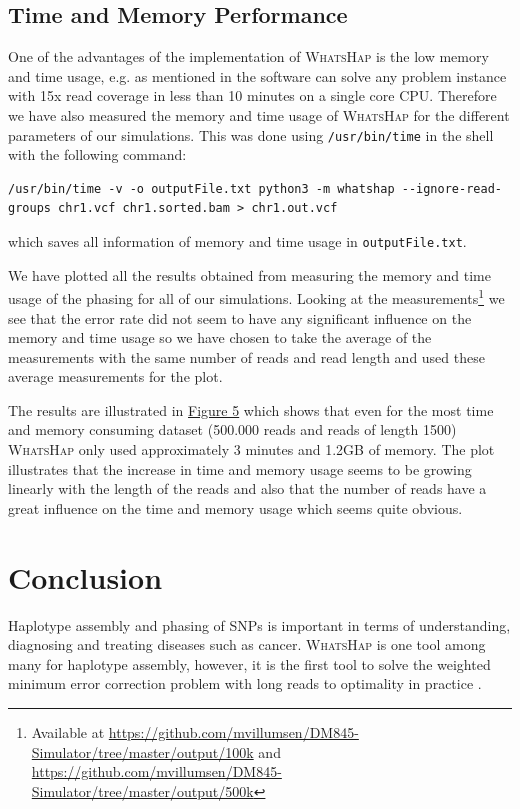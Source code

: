 \documentclass[10pt,a4paper]{article}
\begin{document}
\subsection{Time and Memory Performance}
One of the advantages of the implementation of \textsc{WhatsHap} is the low memory and time usage, e.g. as mentioned in \cite{whatshap} the software can solve any problem instance with 15x read coverage in less than 10 minutes on a single core CPU. Therefore we have also measured the memory and time usage of \textsc{WhatsHap} for the different parameters of our simulations. This was done using \texttt{/usr/bin/time} in the shell with the following command:
\begin{lstlisting}
/usr/bin/time -v -o outputFile.txt python3 -m whatshap --ignore-read-groups chr1.vcf chr1.sorted.bam > chr1.out.vcf
\end{lstlisting}
which saves all information of memory and time usage in \texttt{outputFile.txt}.

We have plotted all the results obtained from measuring the memory and time usage of the phasing for all of our simulations. Looking at the measurements\footnote{Available at \url{https://github.com/mvillumsen/DM845-Simulator/tree/master/output/100k} and \url{https://github.com/mvillumsen/DM845-Simulator/tree/master/output/500k}} we see that the error rate did not seem to have any significant influence on the memory and time usage so we have chosen to take the average of the measurements with the same number of reads and read length and used these average measurements for the plot.

The results are illustrated in \hyperref[fig:performance]{Figure 5} which shows that even for the most time and memory consuming dataset (500.000 reads and reads of length 1500) \textsc{WhatsHap} only used approximately 3 minutes and 1.2GB of memory. The plot illustrates that the increase in time and memory usage seems to be growing linearly with the length of the reads and also that the number of reads have a great influence on the time and memory usage which seems quite obvious.

\section{Conclusion}
Haplotype assembly and phasing of SNPs is important in terms of understanding, diagnosing and treating diseases such as cancer. \textsc{WhatsHap} is one tool among many for haplotype assembly, however, it is the first tool to solve the weighted minimum error correction problem with long reads to optimality in practice \cite{whatshap}.
\end{document}
